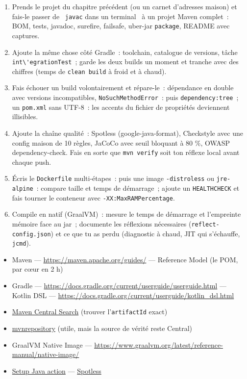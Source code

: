 \documentclass[12pt,a4paper,twoside,openright]{book}
\newcommand{\link}[2]{\href{#2}{#1}}
\begin{document}
\begin{exercice}
\begin{enumerate}
  \item Prends le projet du chapitre pr\'ec\'edent (ou un carnet d'adresses maison) et fais-le passer
        de \og ~\verb|javac| dans un terminal~ \fg{} \`a un projet Maven complet~: BOM, tests, javadoc,
        surefire, failsafe, uber-jar \verb|package|, README avec captures.
  \item Ajoute la m\^eme chose c\^ot\'e Gradle~: toolchain, catalogue de versions, t\^ache
        \verb|int\'egrationTest|~; garde les deux builds un moment et tranche avec des chiffres
        (temps de \verb|clean build| \`a froid et \`a chaud).
  \item Fais \'echouer un build volontairement et r\'epare-le~: d\'ependance en double avec versions
        incompatibles, \verb|NoSuchMethodError|~: puis \verb|dependency:tree|~; un \verb|pom.xml|
        sans UTF-8~: les accents du fichier de propri\'et\'es deviennent illisibles.
  \item Ajoute la cha\^ine qualit\'e~: Spotless (google-java-format), Checkstyle avec une config
        maison de 10 r\`egles, JaCoCo avec seuil bloquant \`a 80 \%, OWASP dependency-check.
        Fais en sorte que \verb|mvn verify| soit ton r\'eflexe local avant chaque push.
  \item \'Ecris le \verb|Dockerfile| multi-\'etapes~: puis une image \verb|-distroless| ou
        \verb|jre-alpine|~: compare taille et temps de d\'emarrage~; ajoute un \verb|HEALTHCHECK|
        et fais tourner le conteneur avec \verb|-XX:MaxRAMPercentage|.
  \item Compile en natif (GraalVM)~: mesure le temps de d\'emarrage et l'empreinte m\'emoire face au
        jar~; documente les r\'eflexions n\'ecessaires (\verb|reflect-config.json|) et ce que tu as
        perdu (diagnostic \`a chaud, JIT qui s'\'echauffe, \verb|jcmd|).
\end{enumerate}
\end{exercice}

\begin{ressources}
\begin{itemize}
  \item Maven --- \url{https://maven.apache.org/guides/} --- Reference Model (le POM, par c\oe{}ur en 2 h)
  \item Gradle --- \url{https://docs.gradle.org/current/userguide/userguide.html} --- Kotlin DSL --- \url{https://docs.gradle.org/current/userguide/kotlin_dsl.html}
  \item \link{Maven Central Search}{https://central.sonatype.com/search} (trouver l'\verb|artifactId| exact)
  \item \link{mvnrepository}{https://mvnrepository.com/} (utile, mais la source de v\'erit\'e reste Central)
  \item GraalVM Native Image --- \url{https://www.graalvm.org/latest/reference-manual/native-image/}
  \item \link{Setup Java action}{https://github.com/actions/setup-java} --- \link{Spotless}{https://github.com/diffplug/spotless}
\end{itemize}
\end{ressources}
\end{document}
